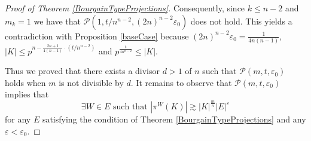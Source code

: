 \documentclass[10pt,a4paper]{amsart}
\begin{document}
\begin{proof}[Proof of Theorem \ref{BourgainTypeProjections}]
    Consequently, since $k \leq n - 2$ and $m_k = 1$ we have that $\mathcal{P}(1, t/{n^{n - 2}}, (2n)^{n - 2}\varepsilon_0)$ does not hold. This yields a contradiction with Proposition \ref{baseCase} because $(2n)^{n - 2}\varepsilon_0 = \frac{1}{4n(n - 1)}$, $|K| \leq  p^{n -   \frac{2n + 1}{4(n - 1)} \cdot (t/n^{n - 2})}$ and $p^{\frac{t}{4n^{n - 2}}} \leq |K|$. 

    Thus we proved that there exists a divisor $d > 1$ of $n$ such that $\mathcal{P}(m, t, \varepsilon_0)$ holds when $m$ is not divisible by $d$. It remains to observe that $\mathcal{P}(m, t, \varepsilon_0)$ implies that
     $$\exists W \in E \text{ such that } |\pi^{W}(K)| \gtrsim |K|^{\frac{m}{n}}|E|^{\varepsilon} $$ for any $E$ satisfying the condition of Theorem \ref{BourgainTypeProjections} and any $\varepsilon < \varepsilon_0$.
\end{proof}
\end{document}
